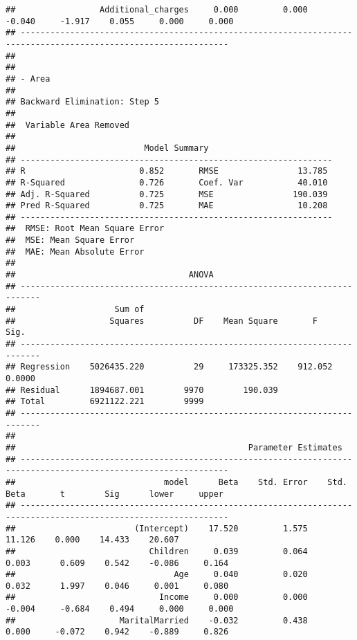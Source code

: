 \documentclass[
]{article}
\begin{document}
\begin{verbatim}
##                 Additional_charges     0.000         0.000       -0.040     -1.917    0.055     0.000     0.000 
## ----------------------------------------------------------------------------------------------------------------
## 
## 
## - Area 
## 
## Backward Elimination: Step 5 
## 
##  Variable Area Removed 
## 
##                          Model Summary                          
## ---------------------------------------------------------------
## R                       0.852       RMSE                13.785 
## R-Squared               0.726       Coef. Var           40.010 
## Adj. R-Squared          0.725       MSE                190.039 
## Pred R-Squared          0.725       MAE                 10.208 
## ---------------------------------------------------------------
##  RMSE: Root Mean Square Error 
##  MSE: Mean Square Error 
##  MAE: Mean Absolute Error 
## 
##                                   ANOVA                                    
## --------------------------------------------------------------------------
##                    Sum of                                                 
##                   Squares          DF    Mean Square       F         Sig. 
## --------------------------------------------------------------------------
## Regression    5026435.220          29     173325.352    912.052    0.0000 
## Residual      1894687.001        9970        190.039                      
## Total         6921122.221        9999                                     
## --------------------------------------------------------------------------
## 
##                                               Parameter Estimates                                                
## ----------------------------------------------------------------------------------------------------------------
##                              model      Beta    Std. Error    Std. Beta       t        Sig      lower     upper 
## ----------------------------------------------------------------------------------------------------------------
##                        (Intercept)    17.520         1.575                  11.126    0.000    14.433    20.607 
##                           Children     0.039         0.064        0.003      0.609    0.542    -0.086     0.164 
##                                Age     0.040         0.020        0.032      1.997    0.046     0.001     0.080 
##                             Income     0.000         0.000       -0.004     -0.684    0.494     0.000     0.000 
##                     MaritalMarried    -0.032         0.438        0.000     -0.072    0.942    -0.889     0.826 

\end{verbatim}
\end{document}
